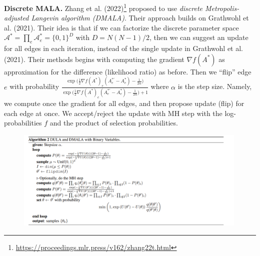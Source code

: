 \documentclass[12pt]{article}
\begin{document}
\begin{enumerate}
            \textbf{Discrete MALA.} Zhang et al. (2022)\footnote{\url{https://proceedings.mlr.press/v162/zhang22t.html}}
            proposed to use \textit{discrete Metropolis-adjusted Langevin algorithm (DMALA)}.
            Their approach builds on Grathwohl et al. (2021). 
            Their idea is that if we can factorize the discrete parameter space 
            $\mathcal{A}^\ast = \prod_e \mathcal{A}^\ast_e = \{0,1\}^D$ with $D=N(N-1)/2$, then we can
            suggest an update for all edges in each iteration, instead of the single
            update in Grathwohl et al. (2021).
            Their methods begins with computing the gradient $\nabla f(A^\ast)$ 
            as approximation for the difference (likelihood ratio) as before. 
            Then we ``flip'' edge $e$ with probability 
            $\frac{\exp\big(\frac{1}{2}\nabla f(A^\ast)_e (A^{\ast'}_e - A^\ast_e) - \frac{1}{2\alpha}\big)}{
                \exp\big(\frac{1}{2}\nabla f(A^\ast)_e (A^{\ast'}_e - A^\ast_e) - \frac{1}{2\alpha}\big) + 1
            } $
            where $\alpha$ is the step size. 
            Namely, we compute once the gradient for all edges, and then propose 
            update (flip) for each edge at once. 
            We accept/reject the update with MH step with the log-probabilities $f$ 
            and the product of selection probabilities.
            \begin{figure}[!ht]
                \centering
                \includegraphics[width=0.99\textwidth]{dmala.png}
            \end{figure}
            


        \end{enumerate}

    
\end{document}
